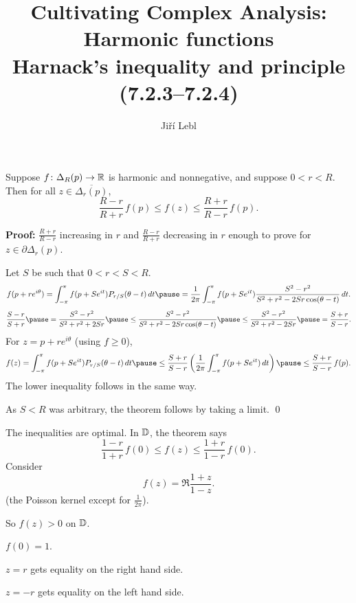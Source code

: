 \documentclass[10pt,aspectratio=169]{beamer}
\author{Ji\v{r}\'i Lebl}
\institute[OSU]{%
Departemento pri Matematiko de Oklahoma {\^S}tata Universitato}
\title{Cultivating Complex Analysis:\\%
Harmonic functions\\%
Harnack's inequality and principle (7.2.3--7.2.4)}
\date{}
\begin{document}
\begin{frame}
\titlepage
\end{frame}

\begin{frame}
\begin{theorem}
Suppose $f \colon \Delta_R(p) \to {\mathbb{R}}$ is harmonic and nonnegative,
and suppose $0 < r < R$.
Then for all $z \in \overline{\Delta_r(p)}$,
\begin{equation*}
\frac{R-r}{R+r} \, f(p) \leq f(z) \leq \frac{R+r}{R-r} \, f(p) .
\end{equation*}
\end{theorem}

\pause

\textbf{Proof:}
$\frac{R+r}{R-r}$ increasing in $r$ and
$\frac{R-r}{R+r}$ decreasing in $r$
\pause
\wthus
enough to prove for
$z \in \partial \Delta_r(p)$.

\pause
Let $S$ be such that $0 < r < S < R$.
\pause
\[
f(p + re^{i\theta})
=
\int_{-\pi}^\pi f(p+Se^{it}) P_{r/S}(\theta-t) \, dt
\pause
=
\frac{1}{2\pi} 
\int_{-\pi}^\pi f(p+Se^{it})
\frac{S^2-r^2}{S^2+r^2-2Sr \cos (\theta-t)}
\, dt .
\]
\pause
\[
\frac{S-r}{S+r}
\pause
=
\frac{S^2-r^2}{S^2+r^2+2Sr}
\pause
\leq
\frac{S^2-r^2}{S^2+r^2-2Sr \cos (\theta-t)}
\pause
\leq
\frac{S^2-r^2}{S^2+r^2-2Sr}
\pause
=
\frac{S+r}{S-r} .
\]
\pause
For $z = p+re^{i\theta}$ (using $f \geq 0$),
\[
f(z)
=
\int_{-\pi}^\pi f(p+Se^{it}) P_{r/S}(\theta-t) \, dt
\pause
\leq
\frac{S+r}{S-r} 
\left(
\frac{1}{2\pi}
\int_{-\pi}^\pi f(p+Se^{it}) \, dt
\right)
\pause
\leq
\frac{S+r}{S-r} 
\,
f(p) .
\]
\pause
The lower inequality follows in the same way.

\pause
As $S<R$ was arbitrary, the theorem follows by taking a limit.
\qed
\end{frame}

\begin{frame}
The inequalities are optimal.
\pause
In ${\mathbb{D}}$, the theorem says
\begin{equation*}
\frac{1-r}{1+r} \, f(0) \leq f(z) \leq \frac{1+r}{1-r} \, f(0) .
\end{equation*}
\pause
Consider
\[f(z) = \Re \frac{1+z}{1-z}.\]
(the Poisson kernel except for
$\frac{1}{2\pi}$).

\pause
\medskip

So $f(z) > 0$ on ${\mathbb{D}}$.

\pause
\medskip

$f(0)=1$.

\medskip
\pause

$z=r$ gets equality on the right hand side.

\medskip
\pause

$z=-r$ gets equality on the left hand side.
\end{frame}
\end{document}
